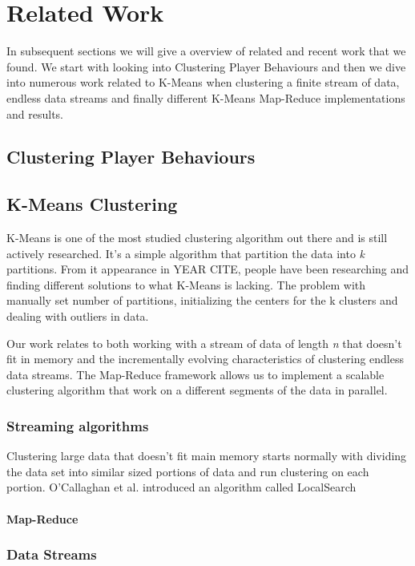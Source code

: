 
\chapter{Related Work} %
\label{Chapter3}

In subsequent sections we will give a overview of related and recent work that we found. 
We start with looking into Clustering Player Behaviours and then we dive into numerous work related to K-Means when clustering a finite stream of data, endless data streams and finally different K-Means Map-Reduce implementations and results.

\section{Clustering Player Behaviours}

\section{K-Means Clustering}
K-Means is one of the most studied clustering algorithm out there and is still actively researched. It's a simple algorithm that partition the data into \textit{k} partitions. From it appearance in YEAR CITE, people have been researching and finding different solutions to what K-Means is lacking. The problem with manually set number of partitions, initializing the centers for the k clusters and dealing with outliers in data. 

Our work relates to both working with a stream of data of length \textit{n} that doesn't fit in memory and the incrementally evolving characteristics of clustering endless data streams. The Map-Reduce framework allows us to implement a scalable clustering algorithm that work on a different segments of the data in parallel.

\subsection{Streaming algorithms}
Clustering large data that doesn't fit main memory starts normally with dividing the data set into similar sized portions of data and run clustering on each portion. O'Callaghan et al. introduced an algorithm called LocalSearch 
\subsubsection{Map-Reduce}

\subsection{Data Streams}

